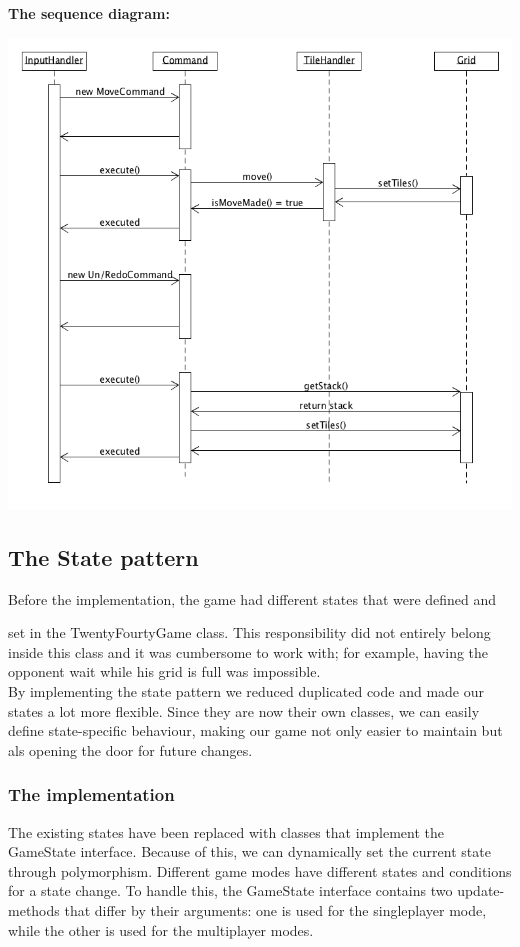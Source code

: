 \documentclass[a4paper,11pt,report]{scrartcl}
\begin{document}
\newpage\textbf{The sequence diagram:}\\
\centerline{\includegraphics[scale=0.5]{sources/commandPatternSequence}}

\newpage\subsection{The State pattern}
Before the implementation, the game had different states that were defined and 

set in the TwentyFourtyGame class. This responsibility did not entirely belong 
inside this class and it was cumbersome to work with; for example, having the
opponent wait while his grid is full was impossible.\\

By implementing the state pattern we reduced duplicated code and 
made our states a lot more flexible. Since they are now their own classes, we 
can easily define state-specific behaviour, making our game not only easier to
maintain but als opening the door for future changes.

\subsubsection{The implementation}

The existing states have been replaced with classes that implement the GameState interface. 
Because of this, we can dynamically set the current state through polymorphism.
Different game modes have different states and conditions for a state change. To handle this,
the GameState interface contains two update-methods that differ by their arguments:
one is used for the singleplayer mode, while the other is used for the multiplayer modes.\\
\end{document}
